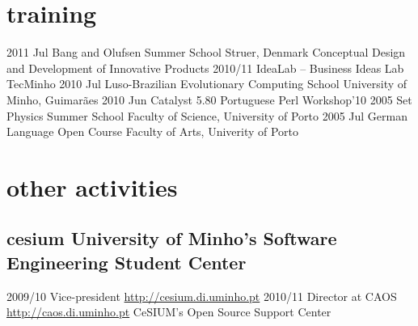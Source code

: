 \documentclass[a4paper]{friggeri-cv}
\begin{document}
\section{training}
\begin{entrylist}
    \entry
        {2011 {\footnotesize Jul}}
        {Bang and Olufsen Summer School}
        {Struer, Denmark}
        {Conceptual Design and Development of Innovative Products}
        {\vspace{-0.4cm}}
    \entry
        {2010/11}
        {IdeaLab -- Business Ideas Lab}
        {TecMinho}
        {}
        {\vspace{-0.8cm}}
    \entry
        {2010 {\footnotesize Jul}}
        {Luso-Brazilian Evolutionary Computing School}
        {University of Minho, Guimarães}
        {}
        {\vspace{-0.8cm}}
    \entry
        {2010 {\footnotesize Jun}}
        {Catalyst 5.80}
        {Portuguese Perl Workshop'10}
        {\vspace{-0.8cm}}
        {}
    \entry
        {2005 {\footnotesize Set}}
        {Physics Summer School}
        {Faculty of Science, University of Porto}
        {\vspace{-0.8cm}}
        {}
    \entry
        {2005 {\footnotesize Jul}}
        {German Language Open Course}
        {Faculty of Arts, Univerity of Porto}
        {\vspace{-0.8cm}}
        {}
\end{entrylist}


\section{other activities}
\subsection{cesium {\normalfont\small University of Minho's Software Engineering Student Center}}{}
\begin{entrylist}
  \entry
    {2009/10}
    {Vice-president}
    {\href{http://cesium.di.uminho.pt}{http://cesium.di.uminho.pt}}
    {\vspace{-.8cm}}
    {}
  \entry
    {2010/11}
    {Director at CAOS}
    {\href{http://caos.di.uminho.pt}{http://caos.di.uminho.pt}}
    {CeSIUM's Open Source Support Center}
    {}
\end{entrylist}
\end{document}
